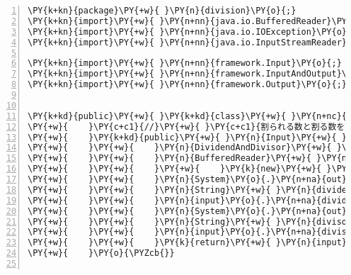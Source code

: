 \begin{Verbatim}[commandchars=\\\{\},numbers=left,firstnumber=1,stepnumber=1,frame=single,fontsize=\small]
\PY{k+kn}{package}\PY{+w}{ }\PY{n}{division}\PY{o}{;}
\PY{k+kn}{import}\PY{+w}{ }\PY{n+nn}{java.io.BufferedReader}\PY{o}{;}
\PY{k+kn}{import}\PY{+w}{ }\PY{n+nn}{java.io.IOException}\PY{o}{;}
\PY{k+kn}{import}\PY{+w}{ }\PY{n+nn}{java.io.InputStreamReader}\PY{o}{;}

\PY{k+kn}{import}\PY{+w}{ }\PY{n+nn}{framework.Input}\PY{o}{;}
\PY{k+kn}{import}\PY{+w}{ }\PY{n+nn}{framework.InputAndOutput}\PY{o}{;}
\PY{k+kn}{import}\PY{+w}{ }\PY{n+nn}{framework.Output}\PY{o}{;}


\PY{k+kd}{public}\PY{+w}{ }\PY{k+kd}{class}\PY{+w}{ }\PY{n+nc}{DivisionIO}\PY{+w}{ }\PY{k+kd}{implements}\PY{+w}{ }\PY{n}{InputAndOutput}\PY{+w}{ }\PY{o}{\PYZob{}}
\PY{+w}{    }\PY{c+c1}{//}\PY{+w}{ }\PY{c+c1}{割られる数と割る数を読み込む}
\PY{+w}{    }\PY{k+kd}{public}\PY{+w}{ }\PY{n}{Input}\PY{+w}{ }\PY{n+nf}{input}\PY{o}{(}\PY{o}{)}\PY{+w}{ }\PY{k+kd}{throws}\PY{+w}{ }\PY{n}{IOException}\PY{+w}{ }\PY{o}{\PYZob{}}
\PY{+w}{    }\PY{+w}{    }\PY{n}{DividendAndDivisor}\PY{+w}{ }\PY{n}{input}\PY{+w}{ }\PY{o}{=}\PY{+w}{ }\PY{k}{new}\PY{+w}{ }\PY{n}{DividendAndDivisor}\PY{o}{(}\PY{o}{)}\PY{o}{;}
\PY{+w}{    }\PY{+w}{    }\PY{n}{BufferedReader}\PY{+w}{ }\PY{n}{reader}\PY{+w}{ }\PY{o}{=}
\PY{+w}{    }\PY{+w}{    }\PY{+w}{    }\PY{k}{new}\PY{+w}{ }\PY{n+nf}{BufferedReader}\PY{o}{(}\PY{k}{new}\PY{+w}{ }\PY{n}{InputStreamReader}\PY{o}{(}\PY{n}{System}\PY{o}{.}\PY{n+na}{in}\PY{o}{)}\PY{o}{)}\PY{o}{;}
\PY{+w}{    }\PY{+w}{    }\PY{n}{System}\PY{o}{.}\PY{n+na}{out}\PY{o}{.}\PY{n+na}{print}\PY{o}{(}\PY{l+s}{"割られる数を入力してください："}\PY{o}{)}\PY{o}{;}
\PY{+w}{    }\PY{+w}{    }\PY{n}{String}\PY{+w}{ }\PY{n}{dividendString}\PY{+w}{ }\PY{o}{=}\PY{+w}{ }\PY{n}{reader}\PY{o}{.}\PY{n+na}{readLine}\PY{o}{(}\PY{o}{)}\PY{o}{;}
\PY{+w}{    }\PY{+w}{    }\PY{n}{input}\PY{o}{.}\PY{n+na}{dividend}\PY{+w}{ }\PY{o}{=}\PY{+w}{ }\PY{n}{Integer}\PY{o}{.}\PY{n+na}{parseInt}\PY{o}{(}\PY{n}{dividendString}\PY{o}{)}\PY{o}{;}
\PY{+w}{    }\PY{+w}{    }\PY{n}{System}\PY{o}{.}\PY{n+na}{out}\PY{o}{.}\PY{n+na}{print}\PY{o}{(}\PY{l+s}{"割る数を入力してください："}\PY{o}{)}\PY{o}{;}
\PY{+w}{    }\PY{+w}{    }\PY{n}{String}\PY{+w}{ }\PY{n}{divisorString}\PY{+w}{ }\PY{o}{=}\PY{+w}{ }\PY{n}{reader}\PY{o}{.}\PY{n+na}{readLine}\PY{o}{(}\PY{o}{)}\PY{o}{;}
\PY{+w}{    }\PY{+w}{    }\PY{n}{input}\PY{o}{.}\PY{n+na}{divisor}\PY{+w}{ }\PY{o}{=}\PY{+w}{ }\PY{n}{Integer}\PY{o}{.}\PY{n+na}{parseInt}\PY{o}{(}\PY{n}{divisorString}\PY{o}{)}\PY{o}{;}
\PY{+w}{    }\PY{+w}{    }\PY{k}{return}\PY{+w}{ }\PY{n}{input}\PY{o}{;}
\PY{+w}{    }\PY{o}{\PYZcb{}}


\end{Verbatim}
